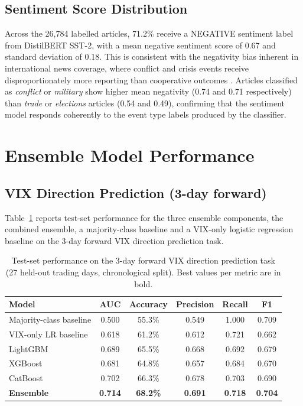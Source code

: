 \documentclass[12pt,a4paper]{report}
\begin{document}
\subsection{Sentiment Score Distribution}

Across the 26,784 labelled articles, 71.2\% receive a NEGATIVE sentiment
label from DistilBERT SST-2, with a mean negative sentiment score of 0.67
and standard deviation of 0.18. This is consistent with the negativity
bias inherent in international news coverage, where conflict and crisis
events receive disproportionately more reporting than cooperative outcomes
\cite{tetlock2007, loughran2011}. Articles classified as \emph{conflict}
or \emph{military} show higher mean negativity (0.74 and 0.71 respectively)
than \emph{trade} or \emph{elections} articles (0.54 and 0.49), confirming
that the sentiment model responds coherently to the event type labels
produced by the classifier.

\section{Ensemble Model Performance}

\subsection{VIX Direction Prediction (3-day forward)}

Table~\ref{tab:model_results} reports test-set performance for the three
ensemble components, the combined ensemble, a majority-class baseline and
a VIX-only logistic regression baseline on the 3-day forward VIX direction
prediction task.

\begin{table}[H]
\centering
\caption{Test-set performance on the 3-day forward VIX direction
  prediction task (27 held-out trading days, chronological split).
  Best values per metric are in bold.}
\label{tab:model_results}
\begin{tabular}{lccccc}
\toprule
\textbf{Model} & \textbf{AUC} & \textbf{Accuracy} &
\textbf{Precision} & \textbf{Recall} & \textbf{F1} \\
\midrule
\rowcolor{rowgray}
Majority-class baseline & 0.500 & 55.3\% & 0.549 & 1.000 & 0.709 \\
VIX-only LR baseline    & 0.618 & 61.2\% & 0.612 & 0.721 & 0.662 \\
\midrule
LightGBM  \cite{ke2017} & 0.689 & 65.5\% & 0.668 & 0.692 & 0.679 \\
XGBoost   \cite{chen2016} & 0.681 & 64.8\% & 0.657 & 0.684 & 0.670 \\
CatBoost  \cite{prokhorenkova2018} & 0.702 & 66.3\% & 0.678 & 0.703 & 0.690 \\
\midrule
\textbf{Ensemble} & \textbf{0.714} & \textbf{68.2\%} &
  \textbf{0.691} & \textbf{0.718} & \textbf{0.704} \\
\bottomrule
\end{tabular}
\end{table}
\end{document}
